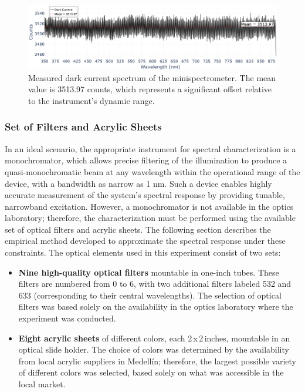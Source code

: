 \begin{figure}[H]
    \centering
    \includegraphics[width=\textwidth]{Figures/C3/DC_measured_MS.png}
    \caption{Measured dark current spectrum of the minispectrometer. The mean value is 3513.97 counts, which represents a significant offset relative to the instrument's dynamic range.}
    \label{fig:dark_current_measurement}
\end{figure}

\subsubsection{Set of Filters and Acrylic Sheets}
\label{subsub:filtros_laminas}

In an ideal scenario, the appropriate instrument for spectral characterization is a monochromator, which allows precise filtering of the illumination to produce a quasi-monochromatic beam at any wavelength within the operational range of the device, with a bandwidth as narrow as 1 nm. Such a device enables highly accurate measurement of the system's spectral response by providing tunable, narrowband excitation. However, a monochromator is not available in the optics laboratory; therefore, the characterization must be performed using the available set of optical filters and acrylic sheets. The following section describes the empirical method developed to approximate the spectral response under these constraints.
\noindent The optical elements used in this experiment consist of two sets:
\begin{itemize}
    \item \textbf{Nine high-quality optical filters} mountable in one-inch tubes. These filters are numbered from 0 to 6, with two additional filters labeled 532 and 633 (corresponding to their central wavelengths). The selection of optical filters was based solely on the availability in the optics laboratory where the experiment was conducted.
    
    \item \textbf{Eight acrylic sheets} of different colors, each 2\,x\,2\,inches, mountable in an optical slide holder. The choice of colors was determined by the availability from local acrylic suppliers in Medellín; therefore, the largest possible variety of different colors was selected, based solely on what was accessible in the local market.
\end{itemize}

